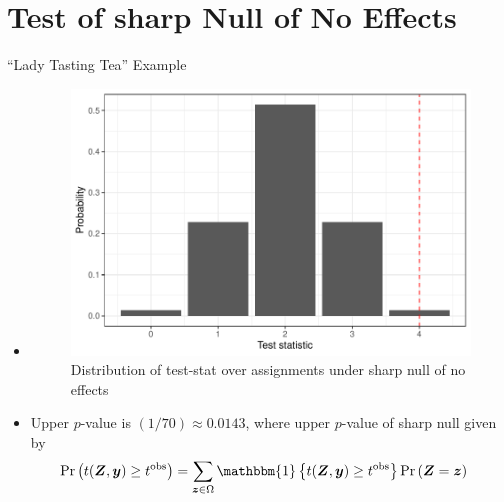 \documentclass[table, xcolor = {dvipsnames}, 9pt]{beamer}
\theoremstyle{plain}
\begin{document}
\section{Test of sharp Null of No Effects}
\begin{frame}{``Lady Tasting Tea'' Example}
\vfill
\begin{itemize}
\item[]
\begin{figure}[H]
\includegraphics[width=0.9\linewidth]{null_dist_plot.pdf}
\caption{Distribution of test-stat over assignments under sharp null of no effects}
\end{figure} \vfill
\vspace{-2em}
\item Upper $p$-value is $(1/70) \approx 0.0143$, where upper $p$-value of sharp null given by
\begin{align*}
\Pr\left(t(\bm{Z}, \bm{y}) \geq t^{\text{obs}}\right) & = \sum \limits_{\bm{z} \in \Omega} \mathbbm{1}\left\{t(\bm{Z}, \bm{y}) \geq t^{\text{obs}}\right\} \Pr\left(\bm{Z} = \bm{z}\right)
\end{align*}
\end{itemize}  
\end{frame}
\end{document}
